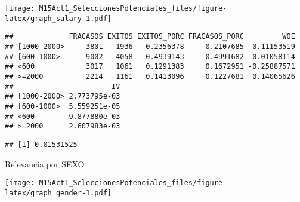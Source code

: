 \documentclass[]{article}
\newenvironment{Shaded}{\begin{snugshade}}{\end{snugshade}}
\newcommand{\KeywordTok}[1]{\textcolor[rgb]{0.13,0.29,0.53}{\textbf{#1}}}
\newcommand{\OperatorTok}[1]{\textcolor[rgb]{0.81,0.36,0.00}{\textbf{#1}}}
\newcommand{\NormalTok}[1]{#1}
\begin{document}
\texttt{[image: M15Act1\_SeleccionesPotenciales\_files/figure-latex/graph\_salary-1.pdf]}

\begin{Shaded}
\end{Shaded}

\begin{verbatim}
##             FRACASOS EXITOS EXITOS_PORC FRACASOS_PORC         WOE
## [1000-2000>     3801   1936   0.2356378     0.2107685  0.11153519
## [600-1000>      9002   4058   0.4939143     0.4991682 -0.01058114
## <600            3017   1061   0.1291383     0.1672951 -0.25887571
## >=2000          2214   1161   0.1413096     0.1227681  0.14065626
##                       IV
## [1000-2000> 2.773795e-03
## [600-1000>  5.559251e-05
## <600        9.877880e-03
## >=2000      2.607983e-03
\end{verbatim}

\begin{Shaded}
\end{Shaded}

\begin{verbatim}
## [1] 0.01531525
\end{verbatim}

Relevancia por SEXO

\begin{Shaded}
\end{Shaded}

\texttt{[image: M15Act1\_SeleccionesPotenciales\_files/figure-latex/graph\_gender-1.pdf]}

\begin{Shaded}
\end{Shaded}
\end{document}
